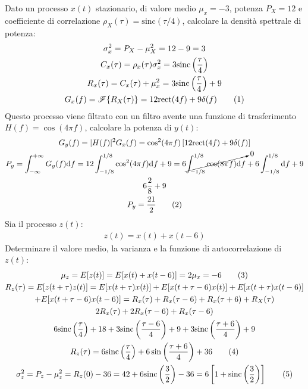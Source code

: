 \documentclass{article}
\newcommand{\rect}{\mathrm{rect}}
\newcommand{\sinc}{\mathrm{sinc}}
\newcommand{\df}{\mathrm{d}}
\newcommand{\tageq}{\tag{\stepcounter{equation}\theequation}}
\begin{document}
Dato un processo $x(t)$ stazionario, di valore medio $\mu_x=-3$, potenza $P_X=12$ e coefficiente di correlazione $\rho_X(\tau)=\sinc(\tau/4)$, calcolare la densità spettrale 
di potenza:
\begin{gather*}
    \sigma_x^2=P_X-\mu_X^2=12-9=3\\
    C_x(\tau)=\rho_x(\tau)\sigma_x^2=3\sinc\displaystyle\left(\frac{\tau}{4}\right)\\
    R_x(\tau)=C_x(\tau)+\mu_x^2=3\sinc\displaystyle\left(\frac{\tau}{4}\right)+9\\
    G_x(f)=\mathscr{F}\{R_X(\tau)\}=12\rect(4f)+9\delta(f)\tageq
\end{gather*}
Questo processo viene filtrato con un filtro avente una funzione di trasferimento $H(f)=\cos(4\pi f)$, calcolare la potenza 
di $y(t)$:
\begin{gather*}
    G_y(f)=|H(f)|^2G_x(f)=\cos^2(4\pi f)\left[12\rect(4f)+9\delta(f)\right]\\
    P_y=\displaystyle\int_{-\infty}^{+\infty}G_y(f)\df f=12\int_{-1/8}^{1/8}\cos^2(4\pi f)\df f+9=6\cancelto{0}{\int_{-1/8}^{1/8}\cos(8\pi f)\df f}+6\int_{-1/8}^{1/8}\df f+9\\
    \displaystyle6\frac{2}{8}+9\\
    P_y=\displaystyle\frac{21}{2}\tageq
\end{gather*}
Sia il processo $z(t)$:
\begin{gather*}
    z(t)=x(t)+x(t-6)
\end{gather*}
Determinare il valore medio, la varianza e la funzione di autocorrelazione di $z(t)$:
\begin{gather*}
    \mu_z=E[z(t)]=E[x(t)+x(t-6)]=2\mu_x=-6\tageq\\
    R_z(\tau)=E[z(t+\tau)z(t)]=E[x(t+\tau)x(t)]+E[x(t+\tau-6)x(t)]+E[x(t+\tau)x(t-6)]\\
    +E[x(t+\tau-6)x(t-6)]=R_x(\tau)+R_x(\tau-6)+R_x(\tau+6)+R_X(\tau)\\
    2R_x(\tau)+2R_x(\tau-6)+R_x(\tau-6)\\
    6\sinc\displaystyle\left(\frac{\tau}{4}\right)+18+3\sinc\left(\frac{\tau-6}{4}\right)+9+3\sinc\left(\frac{\tau+6}{4}\right)+9\\
    R_z(\tau)=6\sinc\left(\displaystyle\frac{\tau}{4}\right)+6\sin\left(\frac{\tau+6}{4}\right)+36\tageq\\
    \sigma_z^2=P_z-\mu_z^2=R_z(0)-36=42+6\sinc\displaystyle\left(\frac{3}{2}\right)-36=6\left[1+\sinc\left(\frac{3}{2}\right)\right]\tageq
\end{gather*}  
\end{document}
